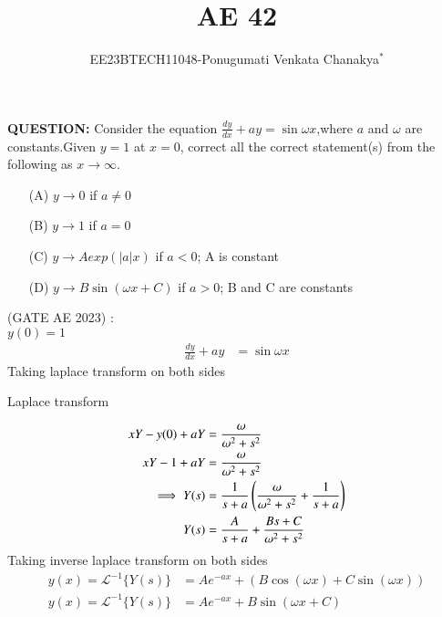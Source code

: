 \documentclass[journal,12pt,twocolumn]{IEEEtran}
\theoremstyle{remark}
\begin{document}
 
 \vspace{3cm}
 \title{\textbf{AE 42}}
 \author{EE23BTECH11048-Ponugumati Venkata Chanakya$^{*}$%
 }
 \maketitle
 \newpage
 \bigskip
 \renewcommand{\thefigure}{\theenumi}
 \renewcommand{\thetable}{\theenumi}
 \textbf{QUESTION:}
Consider the equation $\frac{dy}{dx}+ay=\sin{\omega x}$,where $a$ and $\omega$ are constants.Given $y=1$ at $x=0$, correct all the correct statement(s) from the following as $x\to \infty$.
\begin{enumerate}

  \item[(A)]  $y \to 0$ if $a \neq 0$ \\ 
  \item[(B)]  $y \to 1$ if $a = 0$\\
  \item[(C)]  $y \to Aexp(|a|x)$ if $a < 0$; A is constant\\
  \item[(D)]  $y \to B \sin(\omega x+C)$ if $a>0$; B and C are constants\\
\end{enumerate}
 \hfill(GATE AE 2023)
\solution: \\
  $y(0)=1$
\begin{align}
 \frac{dy}{dx}+ay &= \sin{\omega x}
\end{align}
 Taking laplace transform on both sides 
  \begin{table}[!ht]
    \centering
        
    \caption{Laplace transform}
    \label{tab:Gate AE 42 }
\end{table}
\begin{align}
    xY-y(0)+aY &= \frac{\omega}{\omega^2+s^2}\\
    xY-1+aY &= \frac{\omega}{\omega^2+s^2}\\
    \implies Y(s)&=\frac{1}{s+a} \left(\frac{\omega}{\omega^2+s^2}+\frac{1}{s+a}\right)\\
     Y(s)&=\frac{A}{s+a} +\frac{Bs+C}{\omega^2+s^2}
 \end{align}
 Taking inverse laplace transform on both sides 
 \begin{align}
      y(x) = \mathcal{L}^{-1}\{Y(s)\} &= A e^{-ax} + (B\cos(\omega x) + C\sin(\omega x))\\
       y(x) = \mathcal{L}^{-1}\{Y(s)\} &= A e^{-ax} + B\sin(\omega x+C)
 \end{align}
\end{document}
